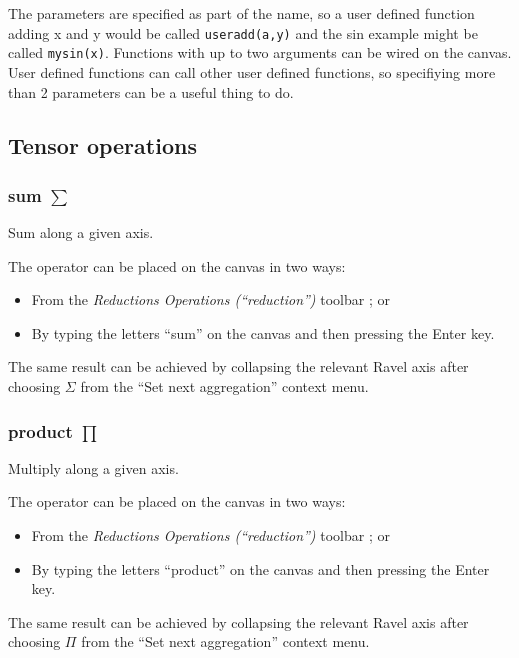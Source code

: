 The parameters are specified as part of the name, so a user defined
function adding x and y would be called \verb'useradd(a,y)' and the
sin example might be called \verb'mysin(x)'. Functions with up to two
arguments can be wired on the canvas. User defined functions can call
other user defined functions, so specifiying more than 2 parameters
can be a useful thing to do.

\subsection{Tensor operations}

\label{Operations: Reduction}

\subsubsection{sum $\sum$}


\label{Operation:sum} Sum along a given axis.

The operator can be placed on the canvas in two ways:
\begin{itemize}
\item From the \emph{Reductions Operations (``reduction'')} toolbar ;
or 
\item By typing the letters ``sum'' on the canvas and then pressing the
Enter key.
\end{itemize}
The same result can be achieved by collapsing the relevant Ravel axis
after choosing $\Sigma$ from the ``Set next
aggregation'' context menu.

\subsubsection{product $\prod$}


\label{Operation:product} Multiply along a given axis.

The operator can be placed on the canvas in two ways:
\begin{itemize}
\item From the \emph{Reductions Operations (``reduction'')} toolbar ;
or 
\item By typing the letters ``product'' on the canvas and then pressing
the Enter key.
\end{itemize}
The same result can be achieved by collapsing the relevant Ravel axis
after choosing $\Pi$ from the ``Set next
aggregation'' context menu.

